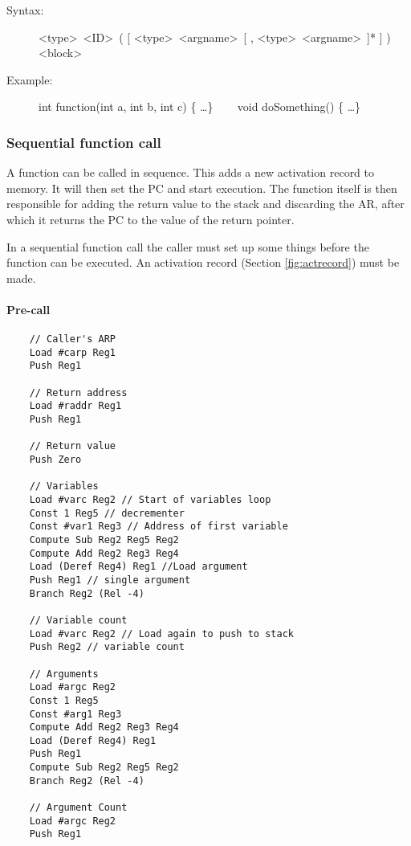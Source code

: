 \documentclass[10pt,a4paper]{report}
\begin{document}
\begin{description}
	\item[Syntax:] 
		\textless type\textgreater ~\textless ID\textgreater ~( [ \textless type\textgreater ~\textless argname\textgreater ~[ , \textless type\textgreater ~\textless argname\textgreater ~]* ] ) \textless block\textgreater
	\item[Example:] 
		int function(int a, int b, int c) \{ \ldots \} ~~~
		void doSomething() \{ \ldots \}
\end{description} 



\subsubsection{Sequential function call}
A function can be called in sequence. This adds a new activation record to memory. It will then set the PC and start execution. The function itself is then responsible for adding the return value to the stack and discarding the AR, after which it returns the PC to the value of the return pointer.


In a sequential function call the caller must set up some things before the function can be executed. An activation record (Section \ref{fig:actrecord}) must be made. 

\paragraph{Pre-call}
\begin{lstlisting}
	// Caller's ARP
	Load #carp Reg1
	Push Reg1 
	
	// Return address
	Load #raddr Reg1	
	Push Reg1
	
	// Return value
	Push Zero
	
	// Variables
	Load #varc Reg2 // Start of variables loop
	Const 1 Reg5 // decrementer
	Const #var1 Reg3 // Address of first variable
	Compute Sub Reg2 Reg5 Reg2
	Compute Add Reg2 Reg3 Reg4
	Load (Deref Reg4) Reg1 //Load argument
	Push Reg1 // single argument
	Branch Reg2 (Rel -4)
	
	// Variable count
	Load #varc Reg2 // Load again to push to stack
	Push Reg2 // variable count
	
	// Arguments
	Load #argc Reg2
	Const 1 Reg5
	Const #arg1 Reg3
	Compute Add Reg2 Reg3 Reg4
	Load (Deref Reg4) Reg1
	Push Reg1
	Compute Sub Reg2 Reg5 Reg2 
	Branch Reg2 (Rel -4)
	
	// Argument Count
	Load #argc Reg2
	Push Reg1
	
\end{lstlisting}
\end{document}
